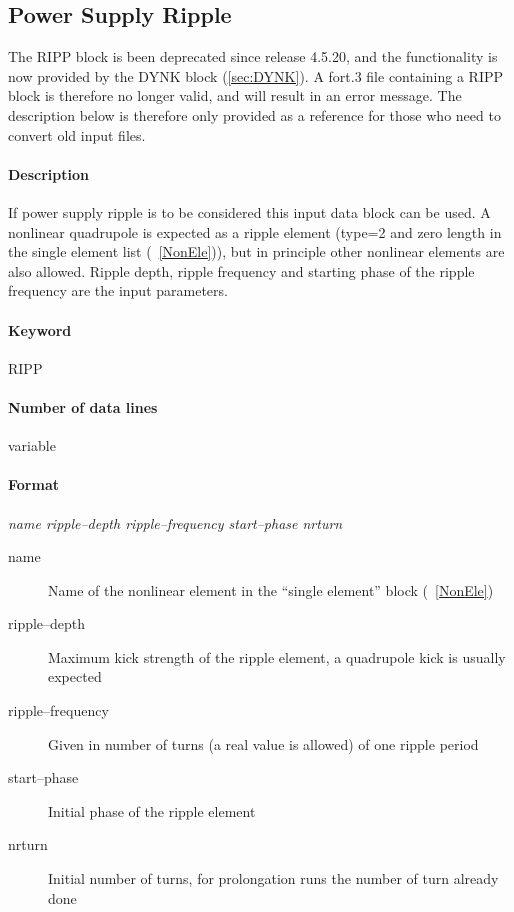 \documentclass[a4paper,11pt]{report}
\begin{document}
\subsection{Power Supply Ripple} \label{PowRip}

The RIPP block is been deprecated since release 4.5.20, and the functionality is now provided by the DYNK block (\ref{sec:DYNK}).
A fort.3 file containing a RIPP block is therefore no longer valid, and will result in an error message.
The description below is therefore only provided as a reference for those who need to convert old input files.

\paragraph{Description} If power supply ripple is to be considered
this input data block can be used. A nonlinear quadrupole is expected
as a ripple element (type=2 and zero length in the single element list
(~\ref{NonEle})), but in principle other nonlinear elements are also
allowed.  Ripple depth, ripple frequency and starting phase of the
ripple frequency are the input parameters.

\paragraph{Keyword} RIPP

\paragraph{Number of data lines} variable

\paragraph{Format} {\em name ripple--depth ripple--frequency start--phase nrturn}

\begin{description}
\item [name] Name of the nonlinear element in the ``single element''
  block (~\ref{NonEle})
\item [ripple--depth] Maximum kick strength of the ripple element, a
  quadrupole kick is usually expected
\item [ripple--frequency] Given in number of turns (a real value is
  allowed) of one ripple period
\item [start--phase] Initial phase of the ripple element
\item [nrturn] Initial number of turns, for prolongation runs the
  number of turn already done
\end{description}
\end{document}
